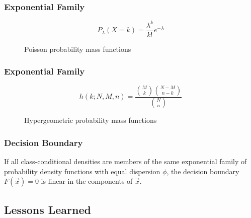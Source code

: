 \begin{frame}
  \frametitle{Exponential Family \cont}

%
  \begin{displaymath}
    P_\lambda(X=k) = \frac{\lambda^k}{k!} e^{-\lambda}
  \end{displaymath}
%
  \begin{figure}
    \caption{Poisson probability mass functions}
  \end{figure}
\end{frame}

\begin{frame}
  \frametitle{Exponential Family \cont}


  \begin{displaymath}
    h(k; N,M,n) = \frac{{M \choose k}{N-M \choose n-k}}{{N \choose n}}
  \end{displaymath}
%
  \begin{figure}
    \caption{Hypergeometric probability mass functions}
  \end{figure}
\end{frame}

\begin{frame}
   \frametitle{Decision Boundary \cont}

   \begin{lemma}
     If all class-conditional densities are members of the same exponential family of probability density functions with equal dispersion $\phi$, the decision boundary $F(\vec x)=0$ is linear in the components of $\vec x$.
   \end{lemma}
\end{frame}


\subsection{Lessons Learned}

